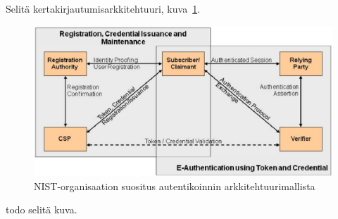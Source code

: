\documentclass[finnish,gradu]{tktltiki}
\begin{document}




  Selitä kertakirjautumisarkkitehtuuri, kuva~\ref{fig:kertakirjautumisarkkitehtuurin_yleiskuva}.
  \begin{figure}
    \centering
    \includegraphics[width=1.0\textwidth]{images/NIST_authentication_architectural_model.jpg}
    \caption{NIST-organisaation suositus autentikoinnin arkkitehtuurimallista \cite{NIST_SP800-63-1} }
    \label{fig:kertakirjautumisarkkitehtuurin_yleiskuva}
  \end{figure}
  todo selitä kuva.
\end{document}
